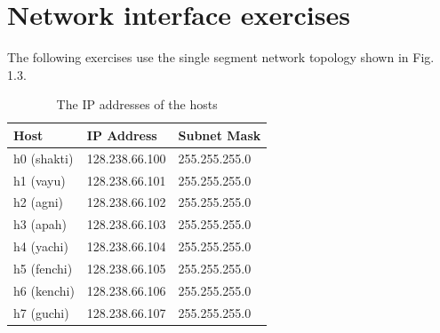 \documentclass[10pt,a4paper]{article}
\numberwithin{equation}{section}
\numberwithin{figure}{section}
\numberwithin{table}{section}
\begin{document}
\section*{Network interface exercises}
    The following exercises use the single segment network topology shown in Fig. 1.3.
    \begin{center}
        \begin{minipage}{0.48\textwidth}
            \begin{flushleft}
                \begin{table}[H]
                    \caption{The IP addresses of the hosts}
                    \vspace{5pt}
                    \centering
                    \large
                    \begin{tabular}{ l l l }
                        \hline \hline
                        Host & IP Address & Subnet Mask \\
                        \hline 
                        h0 (shakti) & 128.238.66.100 & 255.255.255.0 \\
                        h1 (vayu) & 128.238.66.101 & 255.255.255.0 \\
                        h2 (agni) & 128.238.66.102 & 255.255.255.0 \\
                        h3 (apah) & 128.238.66.103 & 255.255.255.0 \\
                        h4 (yachi) & 128.238.66.104 & 255.255.255.0 \\
                        h5 (fenchi) & 128.238.66.105 & 255.255.255.0 \\
                        h6 (kenchi) & 128.238.66.106 & 255.255.255.0 \\
                        h7 (guchi) & 128.238.66.107 & 255.255.255.0 \\
                        \hline \hline
                        \end{tabular}
                \end{table}
            \end{flushleft}
        \end{minipage}
        \begin{minipage}{0.48\textwidth}
            \begin{flushright}
                \begin{figure}[H]
                    \centering
\end{figure}
\end{flushright}
\end{minipage}
\end{center}
\end{document}
